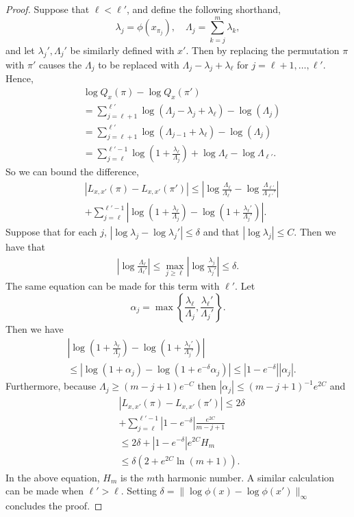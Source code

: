 \documentclass{article}
\begin{document}
\begin{proof}
Suppose that $\ell < \ell'$, and define the following shorthand,
$$
\lambda_j = \phi(x_{\pi_j}), \quad \Lambda_j = \sum_{k=j}^m \lambda_k,
$$
and let $\lambda_j', \Lambda_j'$ be similarly defined with $x'$.
Then by replacing the permutation $\pi$ with $\pi'$ causes the $\Lambda_j$ to be replaced with $\Lambda_j - \lambda_j + \lambda_\ell$ for $j=\ell+1,\ldots,\ell'$.
Hence,
\begin{align*}
&\log Q_x(\pi) - \log Q_x(\pi') \\
& = \sum_{j=\ell+1}^{\ell'} \log\left( \Lambda_j -\lambda_j + \lambda_\ell \right) - \log\left( \Lambda_j \right) \\
& = \sum_{j=\ell+1}^{\ell'} \log\left( \Lambda_{j-1} + \lambda_\ell \right) - \log\left( \Lambda_j \right) \\
&= \sum_{j=\ell}^{\ell' - 1} \log\left(1 + \frac{\lambda_\ell}{\Lambda_j}\right) + \log \Lambda_\ell - \log \Lambda_{\ell'}.
\end{align*}
So we can bound the difference,
\begin{align*}
&|L_{x,x'}(\pi) - L_{x,x'}(\pi')| \le \left| \log \frac{\Lambda_\ell}{\Lambda_\ell'} - \log \frac{\Lambda_{\ell'}}{\Lambda_{\ell'}'} \right|\\
&+ \sum_{j=\ell}^{\ell'-1} \left|\log\left(1 + \frac{\lambda_\ell }{\Lambda_j}\right) - \log\left(1 + \frac{\lambda_\ell'}{\Lambda_j'}\right)\right|.
\end{align*}
Suppose that for each $j$, $|\log \lambda_j - \log \lambda_j'| \le \delta$ and that $|\log \lambda_j| \le C$.
Then we have that
\begin{align*}
    \left| \log \frac{\Lambda_\ell}{\Lambda_{\ell}'} \right| \le \max_{j \ge \ell}\left| \log \frac{\lambda_j}{\lambda_j'} \right| \le \delta.
\end{align*}
The same equation can be made for this term with $\ell'$.
Let 
$$
\alpha_j = \max \left\{ \frac{\lambda_\ell}{\Lambda_j}, \frac{\lambda_\ell'}{\Lambda_j'} \right\}.
$$
Then we have 
\begin{align*}
&\left| \log\left(1 + \frac{\lambda_\ell}{\Lambda_j}\right) - \log\left(1 + \frac{\lambda_\ell'}{\Lambda_j'}\right) \right| \\
&\le \left| \log (1 + \alpha_j ) - \log (1 + e^{-\delta} \alpha_j ) \right| \le \left| 1 - e^{-\delta} \right| |\alpha_j|.
\end{align*}
Furthermore, because $\Lambda_j \ge (m-j +1) e^{-C}$ then $|\alpha_j| \le (m-j+1)^{-1} e^{2C}$ and
\begin{align*}
&|L_{x,x'}(\pi) - L_{x,x'}(\pi')| \le 2 \delta \\
&+ \sum_{j=\ell}^{\ell'-1} |1 - e^{-\delta}| \frac{e^{2C}}{m - j + 1} \\
&\le 2 \delta + |1 - e^{-\delta}| e^{2C} H_m\\
&\le \delta (2 + e^{2C} \ln(m+1)).
\end{align*}
In the above equation, $H_m$ is the $m$th harmonic number.
A similar calculation can be made when $\ell' > \ell$.
Setting $\delta = \|\log \phi(x) - \log \phi(x') \|_\infty$ concludes the proof.
\end{proof}
\end{document}
